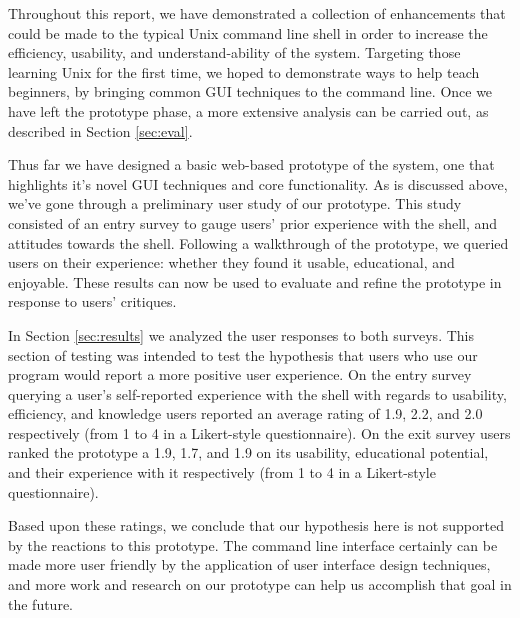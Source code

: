 Throughout this report, we have demonstrated a collection of enhancements that
could be made to the typical Unix command line shell in order to increase the
efficiency, usability, and understand-ability of the system. Targeting those
learning Unix for the first time, we hoped to demonstrate ways to help teach
beginners, by bringing common GUI techniques to the command line. Once we have
left the prototype phase, a more extensive analysis can be carried out, as
described in Section \ref{sec:eval}.

Thus far we have designed a basic web-based prototype of the system, one that
highlights it's novel GUI techniques and core functionality. As is discussed
above, we've gone through a preliminary user study of our prototype. This study
consisted of an entry survey to gauge users' prior experience with the shell,
and attitudes towards the shell. Following a walkthrough of the prototype, we
queried users on their experience: whether they found it usable, educational,
and enjoyable. These results can now be used to evaluate and refine the
prototype in response to users' critiques.

In Section \ref{sec:results} we analyzed the user responses to both surveys. This
section of testing was intended to test the hypothesis that users who use our
program would report a more positive user experience. On the entry survey
querying a user's self-reported experience with the shell with regards to
usability, efficiency, and knowledge users reported an average rating of 1.9,
2.2, and 2.0 respectively (from 1 to 4 in a Likert-style questionnaire). On the
exit survey users ranked the prototype a 1.9, 1.7, and 1.9 on its usability,
educational potential, and their experience with it respectively (from 1 to 4 in
a Likert-style questionnaire).

Based upon these ratings, we conclude that our hypothesis here is not supported
by the reactions to this prototype. The command line interface certainly can be
made more user friendly by the application of user interface design techniques,
and more work and research on our prototype can help us accomplish that goal in
the future.




